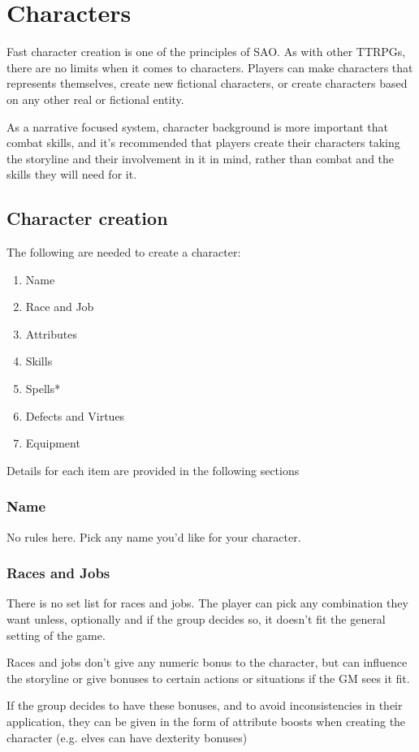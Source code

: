 \chapter{Characters}

Fast character creation is one of the principles of SAO. As with other TTRPGs, there are no limits when it comes to characters. Players can make characters that represents themselves, create new fictional characters, or create characters based on any other real or fictional entity.
\par 
As a narrative focused system, character background is more important that combat skills, and it's recommended that players create their characters taking the storyline and their involvement in it in mind, rather than combat and the skills they will need for it.


\section{Character creation}

The following are needed to create a character:

\begin{enumerate}
\item Name
\item Race and Job
\item Attributes
\item Skills
\item Spells*
\item Defects and Virtues
\item Equipment
\end{enumerate}

Details for each item are provided in the following sections

\subsection{Name}

No rules here. Pick any name you'd like for your character.

\subsection{Races and Jobs}

There is no set list for races and jobs. The player can pick any combination they want unless, optionally and if the group decides so, it doesn't fit the general setting of the game.
\par
Races and jobs don't give any numeric bonus to the character, but can influence the storyline or give bonuses to certain actions or situations if the GM sees it fit. 
\par
If the group decides to have these bonuses, and to avoid inconsistencies in their application, they can be given in the form of attribute boosts when creating the character (e.g. elves can have dexterity bonuses)

